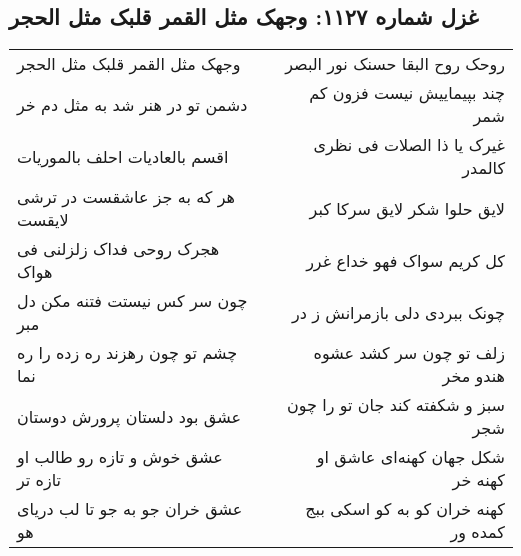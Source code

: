 \begin{center}
\section*{غزل شماره ۱۱۲۷: وجهک مثل القمر قلبک مثل الحجر}
\label{sec:1127}
\begin{longtable}{l p{0.5cm} r}
وجهک مثل القمر قلبک مثل الحجر
&&
روحک روح البقا حسنک نور البصر
\\
دشمن تو در هنر شد به مثل دم خر
&&
چند بپیماییش نیست فزون کم شمر
\\
اقسم بالعادیات احلف بالموریات
&&
غیرک یا ذا الصلات فی نظری کالمدر
\\
هر که به جز عاشقست در ترشی لایقست
&&
لایق حلوا شکر لایق سرکا کبر
\\
هجرک روحی فداک زلزلنی فی هواک
&&
کل کریم سواک فهو خداع غرر
\\
چون سر کس نیستت فتنه مکن دل مبر
&&
چونک ببردی دلی بازمرانش ز در
\\
چشم تو چون رهزند ره زده را ره نما
&&
زلف تو چون سر کشد عشوه هندو مخر
\\
عشق بود دلستان پرورش دوستان
&&
سبز و شکفته کند جان تو را چون شجر
\\
عشق خوش و تازه رو طالب او تازه تر
&&
شکل جهان کهنه‌ای عاشق او کهنه خر
\\
عشق خران جو به جو تا لب دریای هو
&&
کهنه خران کو به کو اسکی ببج کمده ور
\\
\end{longtable}
\end{center}
